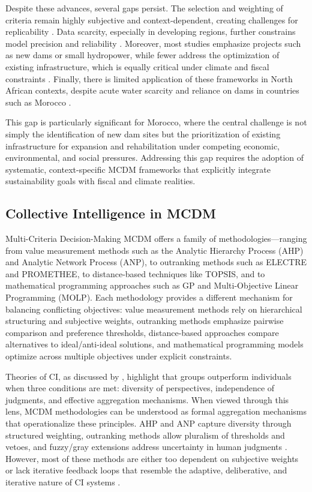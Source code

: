 Despite these advances, several gaps persist. The selection and weighting of criteria remain highly subjective and context-dependent, creating challenges for replicability \cite{Belton2002,Mardani2015}. Data scarcity, especially in developing regions, further constrains model precision and reliability \cite{POHEKAR2004,Dirie2024}. Moreover, most studies emphasize projects such as new dams or small hydropower, while fewer address the optimization of existing infrastructure, which is equally critical under climate and fiscal constraints \cite{KUMAR2017596,Romanelli2018}. Finally, there is limited application of these frameworks in North African contexts, despite acute water scarcity and reliance on dams in countries such as Morocco \cite{ettazarini2021}.

This gap is particularly significant for Morocco, where the central challenge is not simply the identification of new dam sites but the prioritization of existing infrastructure for expansion and rehabilitation under competing economic, environmental, and social pressures. Addressing this gap requires the adoption of systematic, context-specific MCDM frameworks that explicitly integrate sustainability goals with fiscal and climate realities.

\subsection{Collective Intelligence in MCDM}
Multi-Criteria Decision-Making MCDM offers a family of methodologies—ranging from value measurement methods such as the Analytic Hierarchy Process (AHP) and Analytic Network Process (ANP), to outranking methods such as \gls{ELECTRE} and \gls{PROMETHEE}, to distance-based techniques like \gls{TOPSIS}, and to mathematical programming approaches such as \gls{GP} and Multi-Objective Linear Programming (MOLP)\cite{Belton2002,Aruldoss2013}. Each methodology provides a different mechanism for balancing conflicting objectives: value measurement methods rely on hierarchical structuring and subjective weights, outranking methods emphasize pairwise comparison and preference thresholds, distance-based approaches compare alternatives to ideal/anti-ideal solutions, and mathematical programming models optimize across multiple objectives under explicit constraints.

Theories of CI, as discussed by \cite{Woolley2010}, highlight that groups outperform individuals when three conditions are met: diversity of perspectives, independence of judgments, and effective aggregation mechanisms. When viewed through this lens, MCDM methodologies can be understood as formal aggregation mechanisms that operationalize these principles. AHP and ANP capture diversity through structured weighting, outranking methods allow pluralism of thresholds and vetoes, and fuzzy/gray extensions address uncertainty in human judgments \cite{Mardani2015,LIANG1999}. However, most of these methods are either too dependent on subjective weights or lack iterative feedback loops that resemble the adaptive, deliberative, and iterative nature of CI systems \cite{Cinalli2015}.

